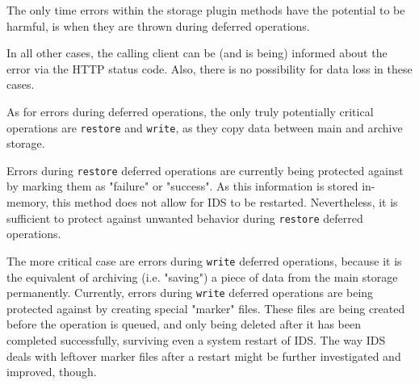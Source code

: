 \documentclass[paper=a4]{scrartcl}
\begin{document}
The only time errors within the storage plugin methods have the potential to be harmful, is when they are thrown during deferred operations.

In all other cases, the calling client can be (and is being) informed about the error via the HTTP status code.
Also, there is no possibility for data loss in these cases.

As for errors during deferred operations, the only truly potentially critical operations are \texttt{restore} and \texttt{write}, as they copy data between main and archive storage.

Errors during \texttt{restore} deferred operations are currently being protected against by marking them as "failure" or "success".
As this information is stored in-memory, this method does not allow for IDS to be restarted.
Nevertheless, it is sufficient to protect against unwanted behavior during \texttt{restore} deferred operations.

The more critical case are errors during \texttt{write} deferred operations, because it is the equivalent of archiving (i.e. "saving") a piece of data from the main storage permanently.
Currently, errors during \texttt{write} deferred operations are being protected against by creating special "marker" files.
These files are being created before the operation is queued, and only being deleted after it has been completed successfully, surviving even a system restart of IDS.
The way IDS deals with leftover marker files after a restart might be further investigated and improved, though.
\end{document}
